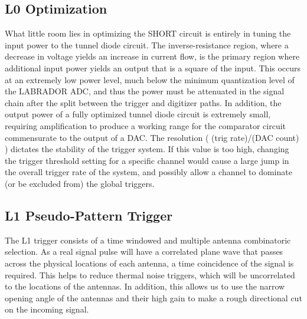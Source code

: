	\subsection{L0 Optimization}
		What little room lies in optimizing the SHORT circuit is entirely in tuning the input power to the tunnel diode circuit.  The inverse-resistance region, where a decrease in voltage yields an increase in current flow, is the primary region where additional input power yields an output that is a square of the input.  This occurs at an extremely low power level, much below the minimum quantization level of the LABRADOR ADC, and thus the power must be attenuated in the signal chain after the split between the trigger and digitizer paths.  In addition, the output power of a fully optimized tunnel diode circuit is extremely small,	requiring amplification to produce a working range for the comparator circuit commensurate to the output of a DAC.  The resolution ( (trig rate)/(DAC count) ) dictates the stability of the trigger system.  If this value is too high, changing the trigger threshold setting for a specific channel would cause a large jump in the overall trigger rate of the system, and possibly allow a channel to dominate (or be excluded from) the global triggers.
		
		
	\subsection{L1 Pseudo-Pattern Trigger}
		The L1 trigger consists of a time windowed and multiple antenna combinatoric selection.  As a real signal pulse will have a correlated plane wave that passes across the physical locations of each antenna, a time coincidence of the signal is required.  This helps to reduce thermal noise triggers, which will be uncorrelated to the locations of the antennas.  In addition, this allows us to use the narrow opening angle of the antennas and their high gain to make a rough directional cut on the incoming signal.
		
